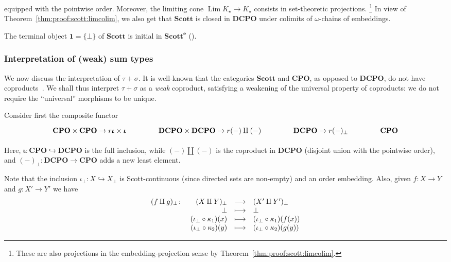 \documentclass[%
  a4paper,
  UKenglish,
  cleveref,
  autoref,
  thm-restate,
  numberwithinsect,
]{lipics-v2021}
\newcommand\longto\longrightarrow
\newcommand\pl{\mathord{-}}	%
\newcommand\emb\hookrightarrow
\newcommand\incl{\boldsymbol{\iota}}		%
\newcommand\one{\mathbf{1}}	%
\newcommand\comp{\mathbin\circ}
\newcommand\radj[1]{\ensuremath{{#1}_{\star}}}	%
\newcommand\Lim{\mathop{\mathrm{Lim}}}
\newcommand\CPO{\mathbf{CPO}}
\newcommand\DCPO{\mathbf{DCPO}}
\newcommand\Scott{\mathbf{Scott}}
\newcommand\arrow\to
\newcommand\PT{\tau}		%
\newcommand\PTbis{\sigma}	%
\newcommand\ep{{\mathbf{e}}}
\begin{document}
\noindent
equipped with the pointwise order.
Moreover, the limiting
cone $\Lim \radj K \to \radj K$ 
consists in set-theoretic projections.%
\footnote{These are also projections in the embedding-projection sense
by Theorem~\ref{thm:proof:scott:limcolim}.}
In view of Theorem~\ref{thm:proof:scott:limcolim},
we also get that $\Scott$ is closed in $\DCPO$
under colimits of $\omega$-chains of embeddings.

The terminal object $\one = \{\bot\}$ of $\Scott$ is initial in $\Scott^\ep$
(\cite[Proposition 7.1.9]{ac98book}).


\subsubsection{Interpretation of (weak) sum types}
\label{sec:proof:sem:pure:sum}

We now discuss the interpretation of $\PT + \PTbis$.
It is well-known that the categories $\Scott$ and $\CPO$,
as opposed to $\DCPO$, do not have coproducts~\cite{hp90tcs}.
We shall thus interpret $\PT + \PTbis$ as a \emph{weak} coproduct,
satisfying a weakening of the
universal property of coproducts:
we do not require the ``universal'' morphisms to be unique.

Consider first the composite functor
\begin{equation}
\label{eq:proof:sem:weaksum}
\begin{tikzcd}[column sep=large]
  \CPO \times \CPO
  \arrow{r}{\incl \times \incl}
& \DCPO \times \DCPO
  \arrow{r}{(\pl) \amalg (\pl)}
& \DCPO
  \arrow{r}{(\pl)_\bot}
& \CPO
\end{tikzcd}
\end{equation}

\noindent
Here, $\incl \colon \CPO \emb \DCPO$ is the full inclusion,
while $(\pl) \amalg (\pl)$ is the coproduct in $\DCPO$
(disjoint union with the pointwise order),
and $(\pl)_\bot \colon \DCPO \to \CPO$
adds a new least element.

Note that the inclusion
$\iota_\bot \colon X \emb X_\bot$
is Scott-continuous (since directed sets are non-empty)
and an order embedding.
Also, given $f \colon X \to Y$ and $g \colon X' \to Y'$
we have
\[
\begin{array}{l r c l}
  (f \amalg g)_\bot \colon
& (X \amalg Y)_\bot
& \longto
& (X' \amalg Y')_\bot
\\
%
& \bot
& \longmapsto
& \bot
\\
%
& (\iota_\bot \comp \kappa_1)(x)
& \longmapsto
& (\iota_\bot \comp \kappa_1)(f(x))
\\
%
& (\iota_\bot \comp \kappa_2)(y)
& \longmapsto
& (\iota_\bot \comp \kappa_2)(g(y))
\end{array}
\]
\end{document}
